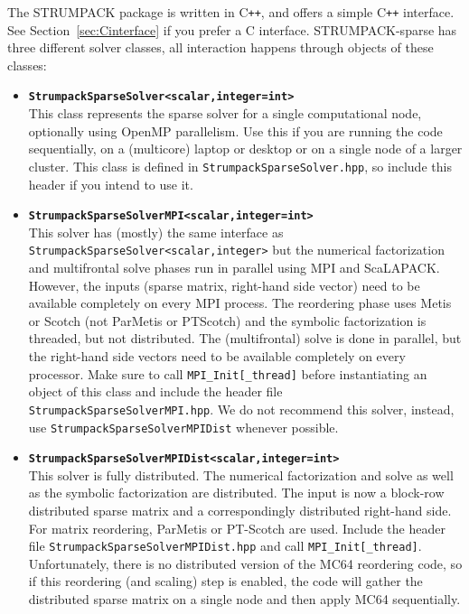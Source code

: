 \documentclass{article}
\begin{document}
The STRUMPACK package is written in C\texttt{++}, and offers a simple
C\texttt{++} interface. See Section~\ref{sec:Cinterface} if you prefer
a C interface. STRUMPACK-sparse has three different solver classes,
all interaction happens through objects of these classes:
\begin{itemize}
\item \textbf{\lstinline[style=C]!StrumpackSparseSolver<scalar,integer=int>!}\\
  This class represents the sparse solver for a single computational
  node, optionally using OpenMP parallelism. Use this if you are
  running the code sequentially, on a (multicore) laptop or desktop or
  on a single node of a larger cluster. This class is defined in
  \lstinline[style=Bash]!StrumpackSparseSolver.hpp!, so include this
  header if you intend to use it.
\item \textbf{\lstinline[style=C]!StrumpackSparseSolverMPI<scalar,integer=int>!}\\
  This solver has (mostly) the same interface as
  \lstinline[style=C]!StrumpackSparseSolver<scalar,integer>!  but
  the numerical factorization and multifrontal solve phases run in
  parallel using MPI and ScaLAPACK. However, the inputs (sparse
  matrix, right-hand side vector) need to be available completely on
  every MPI process. The reordering phase uses Metis or Scotch (not
  ParMetis or PTScotch) and the symbolic factorization is threaded,
  but not distributed. The (multifrontal) solve is done in parallel,
  but the right-hand side vectors need to be available completely on
  every processor. Make sure to call
  \lstinline[style=C]!MPI_Init[_thread]!  before instantiating an
  object of this class and include the header file
  \lstinline[style=Bash]!StrumpackSparseSolverMPI.hpp!. We do not
  recommend this solver, instead, use
  \lstinline[style=C]!StrumpackSparseSolverMPIDist! whenever possible.
\item
  \textbf{\lstinline[style=C]!StrumpackSparseSolverMPIDist<scalar,integer=int>!}\\
  This solver is fully distributed. The numerical factorization and
  solve as well as the symbolic factorization are distributed. The
  input is now a block-row distributed sparse matrix and a
  correspondingly distributed right-hand side. For matrix reordering,
  ParMetis or PT-Scotch are used. Include the header file
  \lstinline[style=Bash]!StrumpackSparseSolverMPIDist.hpp! and call
  \lstinline[style=C]!MPI_Init[_thread]!. Unfortunately, there is no
  distributed version of the MC64 reordering code, so if this
  reordering (and scaling) step is enabled, the code will gather the
  distributed sparse matrix on a single node and then apply MC64
  sequentially.
\end{itemize}
\end{document}
